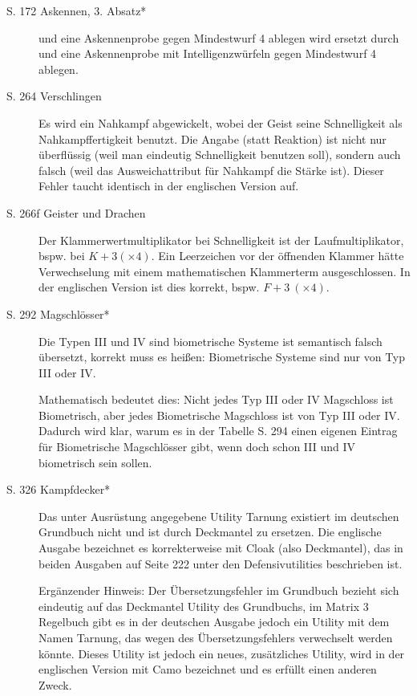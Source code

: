 \documentclass[a4paper]{scrartcl}
\newcommand{\ditoengl}{Dieser Fehler taucht identisch in der englischen Version auf. }
\begin{document}
\begin{description}
 \item[S. 172 Askennen, 3. Absatz*] \glqq und eine Askennenprobe gegen Mindestwurf 4 ablegen\grqq{} wird ersetzt durch \glqq und eine Askennenprobe mit Intelligenzwürfeln gegen Mindestwurf 4 ablegen\grqq.

 \item[S. 264 Verschlingen]
Es wird ein Nahkampf abgewickelt, wobei der Geist seine Schnelligkeit als Nahkampffertigkeit benutzt.
Die Angabe \glqq(statt Reaktion)\grqq{} ist nicht nur überflüssig (weil man eindeutig Schnelligkeit benutzen soll), sondern auch falsch (weil das Ausweichattribut für Nahkampf die Stärke ist). \ditoengl

 \item[S. 266f Geister und Drachen]
Der Klammerwertmultiplikator bei Schnelligkeit ist der Laufmultiplikator, bspw. bei $K+3(\times4)$. Ein Leerzeichen vor der öffnenden Klammer hätte Verwechselung mit einem mathematischen Klammerterm ausgeschlossen. In der englischen Version ist dies korrekt, bspw. $F+3\ (\times4)$.

 \item[S. 292 Magschlösser*]
\glqq Die Typen III und IV sind biometrische Systeme\grqq{} ist semantisch falsch übersetzt, korrekt muss es heißen: \glqq Biometrische Systeme sind nur von Typ III oder IV\grqq.

Mathematisch bedeutet dies: Nicht jedes Typ III oder IV Magschloss ist Biometrisch, aber jedes Biometrische Magschloss ist von Typ III oder IV.
Dadurch wird klar, warum es in der Tabelle S. 294 einen eigenen Eintrag für Biometrische Magschlösser gibt, wenn doch schon III und IV biometrisch sein sollen.

 \item[S. 326 Kampfdecker*]
Das unter Ausrüstung angegebene Utility \glqq Tarnung\grqq{} existiert im deutschen Grundbuch nicht und ist durch \glqq Deckmantel\grqq{} zu ersetzen. Die englische Ausgabe bezeichnet es korrekterweise mit Cloak (also Deckmantel), das in beiden Ausgaben auf Seite 222 unter den Defensivutilities beschrieben ist.

Ergänzender Hinweis: Der Übersetzungsfehler im Grundbuch bezieht sich eindeutig auf das Deckmantel Utility des Grundbuchs, im Matrix 3 Regelbuch gibt es in der deutschen Ausgabe jedoch ein Utility mit dem Namen \glqq Tarnung\grqq, das wegen des Übersetzungsfehlers verwechselt werden könnte.
Dieses Utility ist jedoch ein neues, zusätzliches Utility, wird in der englischen Version mit \glqq Camo\grqq{} bezeichnet und es erfüllt einen anderen Zweck.
\end{description}
\end{document}
